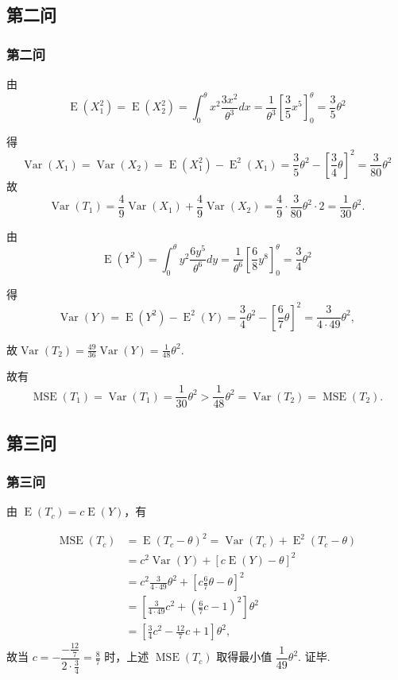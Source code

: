 \subsection{第二问}
\begin{frame}[t,allowframebreaks]
    \frametitle{第二问}
    由 
    \[
        \operatorname{E}(X_1^2)=\operatorname{E}(X_2^2)=\int_{0}^{\theta}x^2\frac{3x^2}{\theta^3}dx=\frac{1}{\theta^3}\left[ \frac{3}{5}x^5\right]^{\theta}_{0}=\frac{3}{5}\theta^2
    \]

    得 
    \[
        \operatorname{Var}(X_1)=\operatorname{Var}(X_2)=\operatorname{E}(X_1^2)-\operatorname{E}^2(X_1)=\frac{3}{5}\theta^2-\left[ \frac{3}{4}\theta \right]^2=\frac{3}{80}\theta^2
    \]
    故 
    \[
        \operatorname{Var}(T_1)=\frac{4}{9}\operatorname{Var}(X_1)+\frac{4}{9}\operatorname{Var}(X_2)=\frac{4}{9} \cdot \frac{3}{80}\theta^2 \cdot 2=\frac{1}{30}\theta^2.
    \]

    由 
    \[
        \operatorname{E}(Y^2)=\int_{0}^{\theta}y^2\frac{6y^5}{\theta^6}dy=\frac{1}{\theta^6}\left[ \frac{6}{8}y^8\right]^{\theta}_{0}=\frac{3}{4}\theta^2
    \]

    得 
    \[
        \operatorname{Var}(Y)=\operatorname{E}(Y^2)-\operatorname{E}^2(Y)=\frac{3}{4}\theta^2-\left[ \frac{6}{7}\theta \right]^2=\frac{3}{4 \cdot 49}\theta^2,
    \]

    故$ \operatorname{Var}(T_2)=\frac{49}{36}\operatorname{Var}(Y)=\frac{1}{48}\theta^2.$

    故有 
    \[
        \operatorname{MSE}(T_1)=\operatorname{Var}(T_1)=\frac{1}{30}\theta^2>\frac{1}{48}\theta^2=\operatorname{Var}(T_2)=\operatorname{MSE}(T_2).
    \]
\end{frame}
\subsection{第三问}
\begin{frame}[t,allowframebreaks]
    \frametitle{第三问}
    由 $\operatorname{E}(T_c)=c\operatorname{E}(Y)$，有

    \[
        \begin{aligned} \operatorname{MSE}(T_c)&=\operatorname{E}(T_c-\theta)^2=\operatorname{Var}(T_c)+\operatorname{E}^2(T_c-\theta) \\ &=c^2\operatorname{Var}(Y)+[c\operatorname{E}(Y)-\theta]^2 \\ &=c^2\frac{3}{4 \cdot 49}\theta^2 +[c \frac{6}{7}\theta-\theta]^2 \\ &=\left[ \frac{3}{4 \cdot 49}c^2+ \left( \frac{6}{7}c -1 \right)^2\right] \theta^2 \\ &=\left[ \frac{3}{4}c^2-\frac{12}{7}c+1 \right] \theta^2, \end{aligned} 
    \]
     故当 $c=-\dfrac{-\frac{12}{7}}{2\cdot\frac{3}{4}}=\frac{8}{7}$ 时，上述 $\operatorname{MSE}(T_c)$ 取得最小值 $\dfrac{1}{49}\theta^2 $. 证毕.
\end{frame}